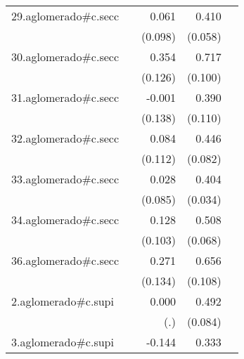 {\begin{longtable}{l*{4}{D{.}{.}{-1}}}
\addlinespace
29.aglomerado#c.secc&                     &       0.061         &       0.410\sym{***}&                     \\
            &                     &     (0.098)         &     (0.058)         &                     \\
\addlinespace
30.aglomerado#c.secc&                     &       0.354\sym{**} &       0.717\sym{***}&                     \\
            &                     &     (0.126)         &     (0.100)         &                     \\
\addlinespace
31.aglomerado#c.secc&                     &      -0.001         &       0.390\sym{***}&                     \\
            &                     &     (0.138)         &     (0.110)         &                     \\
\addlinespace
32.aglomerado#c.secc&                     &       0.084         &       0.446\sym{***}&                     \\
            &                     &     (0.112)         &     (0.082)         &                     \\
\addlinespace
33.aglomerado#c.secc&                     &       0.028         &       0.404\sym{***}&                     \\
            &                     &     (0.085)         &     (0.034)         &                     \\
\addlinespace
34.aglomerado#c.secc&                     &       0.128         &       0.508\sym{***}&                     \\
            &                     &     (0.103)         &     (0.068)         &                     \\
\addlinespace
36.aglomerado#c.secc&                     &       0.271\sym{*}  &       0.656\sym{***}&                     \\
            &                     &     (0.134)         &     (0.108)         &                     \\
\addlinespace
2.aglomerado#c.supi&                     &       0.000         &       0.492\sym{***}&                     \\
            &                     &         (.)         &     (0.084)         &                     \\
\addlinespace
3.aglomerado#c.supi&                     &      -0.144         &       0.333\sym{**} &                     \\

\end{longtable}}
